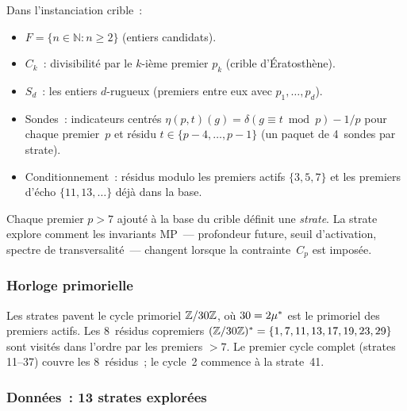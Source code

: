 \documentclass[12pt,a4paper]{article}
\begin{document}
Dans l'instanciation crible~:
\begin{itemize}[nosep]
  \item $F = \{n \in \mathbb{N} : n \ge 2\}$ (entiers candidats).
  \item $C_k$~: divisibilité par le $k$-ième premier $p_k$ (crible
    d'Ératosthène).
  \item $S_d$~: les entiers $d$-rugueux (premiers entre eux avec
    $p_1, \ldots, p_d$).
  \item Sondes~: indicateurs centrés
    $\eta(p, t)(g) = \delta(g \equiv t \bmod p) - 1/p$
    pour chaque premier~$p$ et résidu $t \in \{p{-}4, \ldots, p{-}1\}$
    (un paquet de 4~sondes par strate).
  \item Conditionnement~: résidus modulo les premiers actifs
    $\{3, 5, 7\}$ et les premiers d'écho $\{11, 13, \ldots\}$ déjà
    dans la base.
\end{itemize}

Chaque premier $p > 7$ ajouté à la base du crible définit une
\emph{strate}. La strate explore comment les invariants MP~---
profondeur future, seuil d'activation, spectre de transversalité~---
changent lorsque la contrainte~$C_p$ est imposée.

\subsubsection{Horloge primorielle}
\label{sec:PM_clock}

Les strates pavent le cycle primoriel $\mathbb{Z}/30\mathbb{Z}$, où $30 = 2{\mu^{*}}$
est le primoriel des premiers actifs. Les 8~résidus copremiers
$(\mathbb{Z}/30\mathbb{Z})^* = \{1, 7, 11, 13, 17, 19, 23, 29\}$ sont visités dans
l'ordre par les premiers $> 7$. Le premier cycle complet (strates
11--37) couvre les 8~résidus~; le cycle~2 commence à la strate~41.

\subsubsection{Données~: 13 strates explorées}
\label{sec:PM_data}
\end{document}
